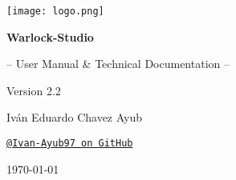 \documentclass[11pt, a4paper]{article}
\begin{document}
\begin{titlepage}
    \begin{tcolorbox}[
        colback=WarlockDark,                    %
        colframe=WarlockGold,                   %
        sharp corners,                          %
        boxrule=1.5pt,                          %
        halign=center,                          %
        valign=center,                          %
        height=\dimexpr\textheight-1cm\relax    %
      ]
      \centering %

      \texttt{[image: logo.png]}\par %

      \vfill %

      \color{white} %

      {\Huge\bfseries Warlock-Studio\par}
      \vspace{0.7cm} %
      {\Large -- User Manual \& Technical Documentation --\par}
      \vspace{0.2cm}
      {\Large Version 2.2\par}

      \vfill %

      {\large Iván Eduardo Chavez Ayub\par}
      \href{https://github.com/Ivan-Ayub97}{\texttt{\color{WarlockGold}@Ivan-Ayub97 on GitHub}}\par %

      \vspace{1.5cm}

      {\large \today\par} %
    \end{tcolorbox}
    \thispagestyle{empty} %
\end{titlepage}


\pagestyle{fancy} %
\end{document}
